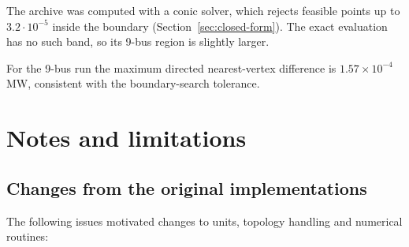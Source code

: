 \documentclass[11pt,a4paper]{report}
\begin{document}
The archive was computed with a conic solver, which rejects feasible points up
to $3.2\cdot10^{-5}$ inside the boundary (Section~\ref{sec:closed-form}). The
exact evaluation has no such band, so its 9-bus region is slightly larger.

For the 9-bus run the maximum directed nearest-vertex difference is
$1.57 \times 10^{-4}$\,MW, consistent with the boundary-search tolerance.

\chapter{Notes and limitations}
\label{ch:gotchas}

\section{Changes from the original implementations}
\label{sec:unitbug}

The following issues motivated changes to units, topology handling and
numerical routines:
\end{document}
